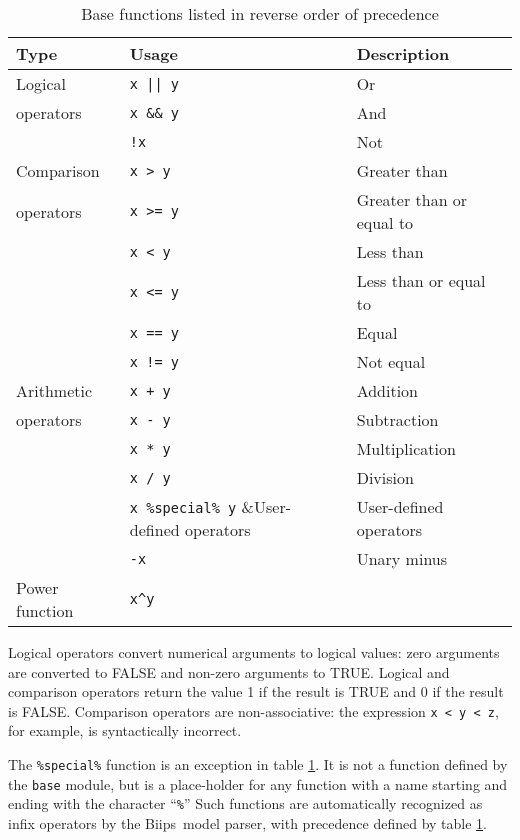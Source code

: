 \documentclass[11pt, a4paper, titlepage]{report}
\newcommand{\biips}{\textsf{Biips}}
\begin{document}
\begin{table}[h!]
\begin{center}
\begin{tabular}{lll}
\hline
Type & Usage & Description\\ 
\hline
Logical           & \verb+x || y+ & Or \\
operators         & \verb+x && y+ & And \\
                  & \verb+!x+     & Not \\
\hline
Comparison  & \verb+x > y+ & Greater than\\
operators   & \verb+x >= y+ & Greater than or equal to  \\
            & \verb+x < y+ & Less than \\
            & \verb+x <= y+ & Less than or equal to \\
            & \verb+x == y+ & Equal \\
            & \verb+x != y+ & Not equal \\
\hline
Arithmetic  & \verb-x + y- & Addition \\
operators   & \verb+x - y+ & Subtraction\\
            & \verb+x * y+ & Multiplication \\
            & \verb+x / y+ & Division \\
            & \verb+x %special% y+ &User-defined operators\\
            & \verb+-x+ & Unary minus\\
\hline
Power function & \verb+x^y+ & \\
\hline
\end{tabular}
\caption{Base functions listed in reverse order of precedence 
  \label{table:base:functions}}
\end{center}
\end{table}

Logical operators convert numerical arguments to logical values: zero
arguments are converted to FALSE and non-zero arguments to
TRUE. Logical and comparison operators return the value 1 if the
result is TRUE and 0 if the result is FALSE.  Comparison operators are
non-associative: the expression \verb+x < y < z+, for example, is
syntactically incorrect.

The \verb+%special%+ function is an exception in table
\ref{table:base:functions}. It is not a function defined by the
\verb+base+ module, but is a place-holder for any function
with a name starting and ending with the character ``\verb+%+'' Such
functions are automatically recognized as infix operators by the
\biips\ model parser, with precedence defined by table
\ref{table:base:functions}.
\end{document}
